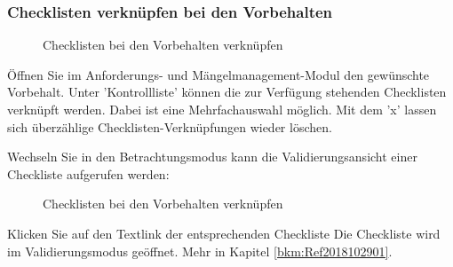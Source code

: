 \subsubsection{Checklisten verknüpfen bei den Vorbehalten}

\begin{figure}[H]
\caption{Checklisten bei den Vorbehalten verknüpfen}
\end{figure}

Öffnen Sie im Anforderungs- und Mängelmanagement-Modul den gewünschte Vorbehalt. Unter 'Kontrollliste'  können die zur Verfügung stehenden Checklisten verknüpft werden. Dabei ist eine Mehrfachauswahl möglich. Mit dem 'x'  lassen sich überzählige Checklisten-Verknüpfungen wieder löschen.

\vspace{\baselineskip}

Wechseln Sie in den Betrachtungsmodus  kann die Validierungsansicht einer Checkliste aufgerufen werden:

\begin{figure}[H]
\caption{Checklisten bei den Vorbehalten verknüpfen}
\end{figure}

Klicken Sie auf den Textlink der entsprechenden Checkliste  Die Checkliste wird im Validierungsmodus geöffnet. Mehr in Kapitel \ref{bkm:Ref2018102901}.

